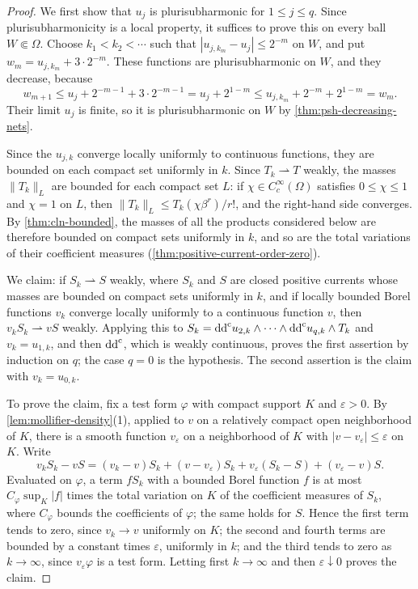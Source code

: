 \begin{proof}
We first show that $u_j$ is plurisubharmonic for $1\le j\le q$. Since plurisubharmonicity is a local property, it suffices to prove this on every ball $W\Subset\Omega$. Choose $k_1<k_2<\cdots$ such that $|u_{j,k_m}-u_j|\le2^{-m}$ on $W$, and put $w_m=u_{j,k_m}+3\cdot2^{-m}$. These functions are plurisubharmonic on $W$, and they decrease, because
\[
 w_{m+1}\le u_j+2^{-m-1}+3\cdot2^{-m-1}=u_j+2^{1-m}\le u_{j,k_m}+2^{-m}+2^{1-m}=w_m.
\]
Their limit $u_j$ is finite, so it is plurisubharmonic on $W$ by \cref{thm:psh-decreasing-nets}.

Since the $u_{j,k}$ converge locally uniformly to continuous functions, they are bounded on each compact set uniformly in $k$. Since $T_k\rightharpoonup T$ weakly, the masses $\|T_k\|_L$ are bounded for each compact set $L$: if $\chi\in C^\infty_c(\Omega)$ satisfies $0\le\chi\le1$ and $\chi=1$ on $L$, then $\|T_k\|_L\le T_k(\chi\beta^r)/r!$, and the right-hand side converges. By \cref{thm:cln-bounded}, the masses of all the products considered below are therefore bounded on compact sets uniformly in $k$, and so are the total variations of their coefficient measures (\cref{thm:positive-current-order-zero}).

We claim: if $S_k\rightharpoonup S$ weakly, where $S_k$ and $S$ are closed positive currents whose masses are bounded on compact sets uniformly in $k$, and if locally bounded Borel functions $v_k$ converge locally uniformly to a continuous function $v$, then $v_kS_k\rightharpoonup vS$ weakly. Applying this to $S_k=\mathrm{dd}^{\mathrm{c}} u_{2,k}\wedge\cdots\wedge\mathrm{dd}^{\mathrm{c}} u_{q,k}\wedge T_k$ and $v_k=u_{1,k}$, and then $\mathrm{dd}^{\mathrm{c}}$, which is weakly continuous, proves the first assertion by induction on $q$; the case $q=0$ is the hypothesis. The second assertion is the claim with $v_k=u_{0,k}$.

To prove the claim, fix a test form $\varphi$ with compact support $K$ and $\varepsilon>0$. By \cref{lem:mollifier-density}(1), applied to $v$ on a relatively compact open neighborhood of $K$, there is a smooth function $v_\varepsilon$ on a neighborhood of $K$ with $|v-v_\varepsilon|\le\varepsilon$ on $K$. Write
\[
 v_kS_k-vS=(v_k-v)S_k+(v-v_\varepsilon)S_k
             +v_\varepsilon(S_k-S)+(v_\varepsilon-v)S.
\]
Evaluated on $\varphi$, a term $fS_k$ with a bounded Borel function $f$ is at most $C_\varphi\sup_K|f|$ times the total variation on $K$ of the coefficient measures of $S_k$, where $C_\varphi$ bounds the coefficients of $\varphi$; the same holds for $S$. Hence the first term tends to zero, since $v_k\to v$ uniformly on $K$; the second and fourth terms are bounded by a constant times $\varepsilon$, uniformly in $k$; and the third tends to zero as $k\to\infty$, since $v_\varepsilon\varphi$ is a test form. Letting first $k\to\infty$ and then $\varepsilon\downarrow0$ proves the claim.
\end{proof}

